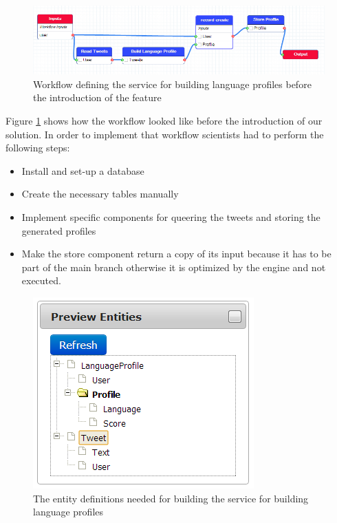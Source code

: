 \begin{figure}[h!]
  \centering
  	\includegraphics[scale=0.5]{storage/eval/before.png}
  \caption{Workflow defining the service for building language profiles before the introduction of the feature}
  \label{fig:storageEvalBefore}
\end{figure}

Figure \ref{fig:storageEvalBefore} shows how the workflow looked like before the introduction of our solution. In order to implement that workflow scientists had to perform the following steps:
\begin{itemize}
	\item Install and set-up a database
	\item Create the necessary tables manually
	\item Implement specific components for queering the tweets and storing the generated profiles
	\item Make the store component return a copy of its input because it has to be part of the main branch otherwise it is optimized by the engine and not executed.
\end{itemize}

\begin{figure}[h!]
  \centering
  	\includegraphics[scale=0.5]{storage/eval/entities.png}
  \caption{The entity definitions needed for building the service for building language profiles}
  \label{fig:storageEvalEntities}
\end{figure}

